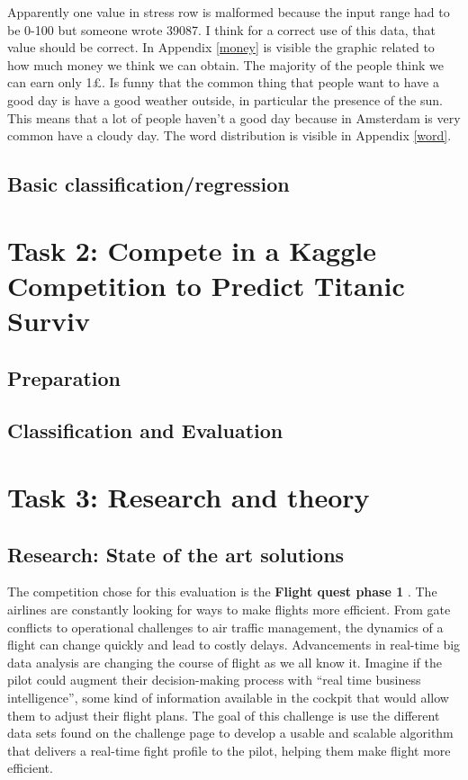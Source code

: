 \documentclass{vldb}
\begin{document}
	Apparently one value in stress row is malformed because the input range had to be 0-100 but someone wrote 39087.
	I think for a correct use of this data, that value should be correct.
	In Appendix \ref{money} is visible the graphic related to how much money we think we can obtain.
	The majority of the people think we can earn only 1£. 
	Is funny that the common thing that people want to have a good day is have a good weather outside, in particular the presence of the sun.
	This means that a lot of people haven't a good day because in Amsterdam is very common have a cloudy day. The word distribution is visible in Appendix \ref{word}.
		
	\subsection{Basic classification/regression}
	
\section{Task 2: Compete in a Kaggle Competition to Predict Titanic Surviv}

	\subsection{Preparation}
	\subsection{Classification and Evaluation}

\section{Task 3: Research and theory}

	\subsection{Research: State of the art solutions}
	The competition chose for this evaluation is the \textbf{Flight quest phase 1} \cite{first}.
	The airlines are constantly looking for ways to make flights more efficient.
	From gate conflicts to operational challenges to air traffic management, the dynamics of a flight can change quickly and lead to costly delays.
	Advancements in real-time big data analysis are changing the course of flight as we all know it.
	Imagine if the pilot could augment their decision-making process with ``real time business intelligence'', some kind of information available in the cockpit that would allow them to adjust their flight plans.
	The goal of this challenge is use the different data sets found on the challenge page to develop a usable and scalable algorithm that delivers a real-time fight profile to the pilot, helping them make flight more efficient.
\end{document}

